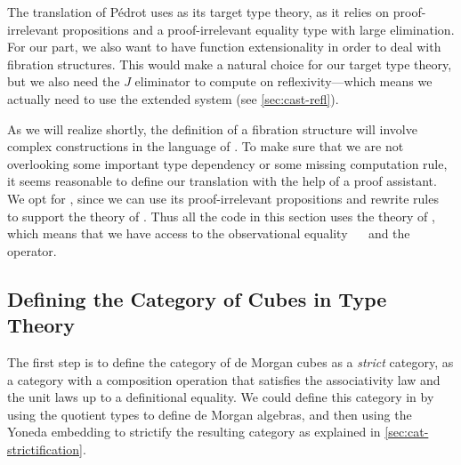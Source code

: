 The translation of Pédrot uses 
 as its target 
type theory, as it relies on proof-irrelevant propositions and a proof-irrelevant
equality type with large elimination.
% 
For our part, we also want to have function extensionality in order to deal with 
fibration structures.
% 
This would make \SetoidCC a natural choice for our target type theory, 
but we also need the \( J \) eliminator to compute on reflexivity---which means
we actually need to use the extended system \SetoidCCplus (see \cref{sec:cast-refl}).

As we will realize shortly, the definition of a fibration structure 
will involve complex constructions in the language of \SetoidCCplus.
% 
To make sure that we are not overlooking some important type dependency or some 
missing computation rule, it seems reasonable to define our translation with the help of a 
proof assistant.
% 
We opt for \Agda, since we can use its proof-irrelevant propositions and rewrite 
rules~ to support the theory of \SetoidCCplus.
% 
Thus all the \Agda code in this section uses the theory of \SetoidCCplus, which
means that we have access to the observational equality 
~\func{\textasciitilde{}}~ and the  operator.


\subsection{Defining the Category of Cubes in Type Theory}

The first step is to define the category of de Morgan cubes as a \emph{strict}
category, \ie as a category with a composition
operation that satisfies the associativity law and the unit laws up to a 
definitional equality.
% 
We could define this category in \SetoidCCplus by using the quotient
types to define de Morgan algebras, and then using the Yoneda embedding to
strictify the resulting category as explained in \cref{sec:cat-strictification}.

